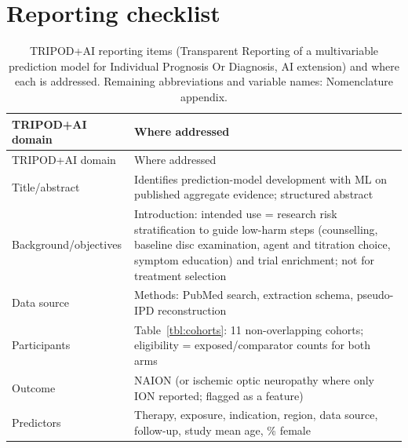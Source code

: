 \documentclass[journal]{IEEEtran}
\begin{document}
\section{Reporting checklist}\label{reporting-checklist}

{\footnotesize
\begin{longtable}[]{@{}
  >{\raggedright\arraybackslash}p{}
  >{\raggedright\arraybackslash}p{}@{}}
\caption{TRIPOD+AI reporting items (Transparent Reporting of a
multivariable prediction model for Individual Prognosis Or Diagnosis, AI
extension) and where each is addressed. Remaining abbreviations and
variable names: Nomenclature appendix.}\tabularnewline
\toprule\noalign{}
\begin{minipage}[b]{\linewidth}\raggedright
TRIPOD+AI domain
\end{minipage} & \begin{minipage}[b]{\linewidth}\raggedright
Where addressed
\end{minipage} \\
\midrule\noalign{}
\endfirsthead
\toprule\noalign{}
\begin{minipage}[b]{\linewidth}\raggedright
TRIPOD+AI domain
\end{minipage} & \begin{minipage}[b]{\linewidth}\raggedright
Where addressed
\end{minipage} \\
\midrule\noalign{}
\endhead
\bottomrule\noalign{}
\endlastfoot
Title/abstract & Identifies prediction-model development with ML on
published aggregate evidence; structured abstract \\
Background/objectives & Introduction: intended use = research risk
stratification to guide low-harm steps (counselling, baseline disc
examination, agent and titration choice, symptom education) and trial
enrichment; not for treatment selection \\
Data source & Methods: PubMed search, extraction schema, pseudo-IPD
reconstruction \\
Participants & Table~\ref{tbl:cohorts}: 11 non-overlapping cohorts;
eligibility = exposed/comparator counts for both arms \\
Outcome & NAION (or ischemic optic neuropathy where only ION reported;
flagged as a feature) \\
Predictors & Therapy, exposure, indication, region, data source,
follow-up, study mean age, \% female \\

\end{longtable}}
\end{document}
